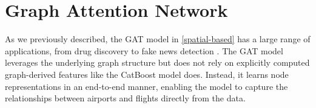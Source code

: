\section[Graph Attention Network]{Graph Attention Network}
\label{Graph Attention Network}

As we previously described, the GAT model in \ref{spatial-based} has a large range of applications, from drug discovery to fake news detection \cite{keywordsCaravanti}. The GAT model leverages the underlying graph structure but does not rely on explicitly computed graph-derived features like the CatBoost model does. Instead, it learns node representations in an end-to-end manner, enabling the model to capture the relationships between airports and flights directly from the data.



